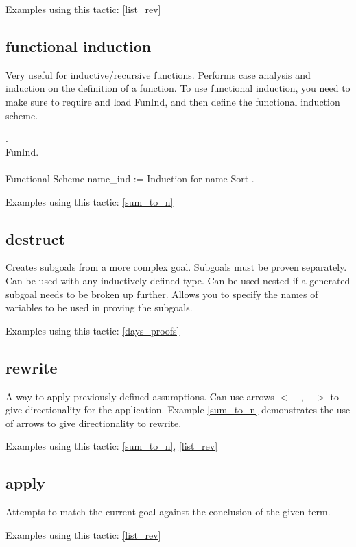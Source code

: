 \noindent
Examples using this tactic: 
\ref{list_rev}




\subsection{functional induction} \label{functional induction}
Very useful for inductive/recursive functions.
Performs case analysis and induction on the definition of a function.
To use functional induction, you need to make sure to require and load FunInd, and then define the functional induction scheme.

\begin{code}
 .	\\
\Load FunInd.
\\ \\
Functional Scheme name\_ind := Induction for name Sort .
\end{code}

\noindent
Examples using this tactic: 
\ref{sum_to_n}




\subsection{destruct} \label{destruct}
Creates subgoals from a more complex goal. 
Subgoals must be proven separately.
Can be used with any inductively defined type.
Can be used nested if a generated subgoal needs to be broken up further.
Allows you to specify the names of variables to be used in proving the subgoals.

\noindent
Examples using this tactic: 
\ref{days_proofs}




\subsection{rewrite} \label{rewrite}
A way to apply previously defined assumptions.
Can use arrows $<-$ , $->$ to give directionality for the application.
Example \ref{sum_to_n} demonstrates the use of arrows to give directionality to rewrite.

\noindent
Examples using this tactic: 
\ref{sum_to_n}, \ref{list_rev}




\subsection{apply} \label{apply}
Attempts to match the current goal against the conclusion of the given term.

\noindent
Examples using this tactic:
\ref{list_rev}






